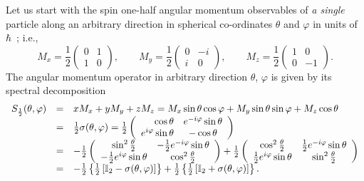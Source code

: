 \documentclass[pra,amsfonts,showpacs,showkeys,preprint]{revtex4}
\begin{document}
Let us start with the spin one-half angular momentum observables of {\em a single} particle along an arbitrary direction
in spherical co-ordinates $\theta$ and $\varphi$
in units of $\hbar$~\cite{schiff-55}; i.e.,
\begin{equation}
M_x=
\frac{1}{2}
\left(
\begin{array}{cccccccccc}
0&1\\
1&0
\end{array}
\right),
\qquad
M_y=
\frac{1}{2}
\left(
\begin{array}{cccccccccc}
0&-i\\
i&0
\end{array}
\right),
\qquad
M_z=
\frac{1}{2}
\left(
\begin{array}{cccccccccc}
1&0\\
0&-1
\end{array}
\right).
\end{equation}
The angular momentum operator in arbitrary direction $\theta$, $\varphi$ is given by its spectral decomposition
\begin{equation}
\begin{array}{rcl}
S_\frac{1}{2} (\theta ,\varphi) &=&
xM_x
+
yM_y
+
zM_z
=
 M_x  \sin \theta \cos \varphi
+
M_y   \sin \theta \sin \varphi
+
M_z   \cos \theta
\\
&=&   \frac{1}{2}\sigma (\theta ,\varphi)=
{1\over 2}
\left(\begin{array}{rcl}
\cos \theta &  e^{-i \varphi }\sin \theta \\
e^{i \varphi }\sin \theta & - \cos \theta
\end{array}
\right)\\
&=&
-
\frac{1}{2}
\left(
\begin{array}{cc}
 \sin ^2 \frac{\theta }{2} & -\frac{1}{2} e^{-i \varphi } \sin \theta  \\
 -\frac{1}{2} e^{i \varphi } \sin \theta  & \cos ^2\frac{\theta  }{2}
\end{array}
\right)
+
\frac{1}{2}
 \left(
\begin{array}{cc}
 \cos ^2 \frac{\theta }{2} & \frac{1}{2} e^{-i \varphi } \sin \theta  \\
 \frac{1}{2} e^{i \varphi } \sin \theta  & \sin ^2 \frac{\theta }{2}
\end{array}
\right)\\
&=&
-
\frac{1}{2}
\left\{
\frac{1}{2}
\left[
{\Bbb I}_2 - \sigma (\theta ,\varphi)
\right]
\right\}
+
\frac{1}{2}
\left\{
\frac{1}{2}
\left[
{\Bbb I}_2 + \sigma (\theta ,\varphi)
\right]
\right\}
.
\end{array}
\label{e-2009-gtq-s2}
\end{equation}
\end{document}
